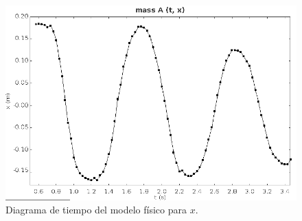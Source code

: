 \begin{figure}[h]
 \centering
 \includegraphics[scale=0.3]{./img/tracker_poc_timeplot_x.png}
 \caption{Diagrama de tiempo del modelo físico para $x$.}
 \label{fig: tracker phase diagram y vy}
\end{figure}
